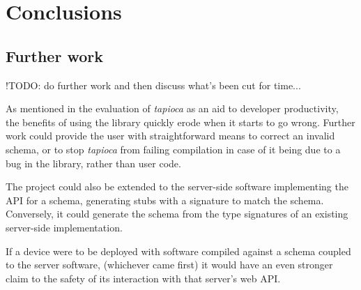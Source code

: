 \section{Conclusions} \label{concl}

\subsection{Further work} \label{concl:further}

!TODO: do further work and then discuss what's been cut for time...

As mentioned in the evaluation of \emph{tapioca} as an aid to developer productivity,~ the benefits of using the library quickly erode when it starts to go wrong. Further work could provide the user with straightforward means to correct an invalid schema, or to stop \emph{tapioca} from failing compilation in case of it being due to a bug in the library, rather than user code.

The project could also be extended to the server-side software implementing the API for a schema, generating stubs with a signature to match the schema. Conversely, it could generate the schema from the type signatures of an existing server-side implementation.

If a device were to be deployed with software compiled against a schema coupled to the server software, (whichever came first) it would have an even stronger claim to the safety of its interaction with that server's web API.